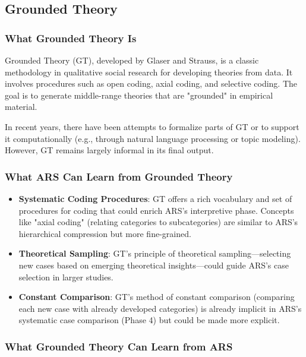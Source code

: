 \documentclass[12pt,a4paper]{article}
\begin{document}
\subsection{Grounded Theory}

\subsubsection{What Grounded Theory Is}

Grounded Theory (GT), developed by Glaser and Strauss, is a classic methodology 
in qualitative social research for developing theories from data. It involves 
procedures such as open coding, axial coding, and selective coding. The goal 
is to generate middle-range theories that are "grounded" in empirical material.

In recent years, there have been attempts to formalize parts of GT or to 
support it computationally (e.g., through natural language processing or 
topic modeling). However, GT remains largely informal in its final output.

\subsubsection{What ARS Can Learn from Grounded Theory}

\begin{itemize}
    \item \textbf{Systematic Coding Procedures}: GT offers a rich vocabulary 
    and set of procedures for coding that could enrich ARS's interpretive 
    phase. Concepts like "axial coding" (relating categories to subcategories) 
    are similar to ARS's hierarchical compression but more fine-grained.
    
    \item \textbf{Theoretical Sampling}: GT's principle of theoretical 
    sampling—selecting new cases based on emerging theoretical insights—could 
    guide ARS's case selection in larger studies.
    
    \item \textbf{Constant Comparison}: GT's method of constant comparison 
    (comparing each new case with already developed categories) is already 
    implicit in ARS's systematic case comparison (Phase 4) but could be 
    made more explicit.
\end{itemize}

\subsubsection{What Grounded Theory Can Learn from ARS}
\end{document}
